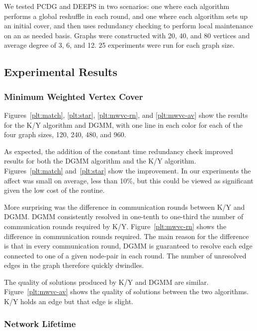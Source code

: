 We tested PCDG and DEEPS in two scenarios: one where each algorithm performs a global reshuffle in each round, and one where each algorithm sets up an initial cover, and then uses redundancy checking to perform local maintenance on an as needed basis. Graphs were constructed with 20, 40, and 80 vertices and average degree of 3, 6, and 12. 25 experiments were run for each graph size.
 
\subsection{Experimental Results}
\label{sub:exp-results}
\subsubsection{Minimum Weighted Vertex Cover}
\label{sub:mwvc-results}

Figures~\ref{plt:match}, \ref{plt:star}, \ref{plt:mwvc-rn}, and \ref{plt:mwvc-av} show the results for the K/Y algorithm and DGMM, with one line in each color for each of the four graph sizes, 120, 240, 480, and 960.

As expected, the addition of the constant time redundancy check improved results for both the DGMM algorithm and the K/Y algorithm. Figures~\ref{plt:match} and~\ref{plt:star} show the improvement. In our experiments the affect was small on average, less than 10\%, but this could be viewed as significant given the low cost of the routine. 


More surprising was the difference in communication rounds between K/Y and DGMM. DGMM consistently resolved in one-tenth to one-third the number of communication rounds required by K/Y. Figure~\ref{plt:mwvc-rn} shows the difference in communication rounds required. The main reason for the difference is that in every communication round, DGMM is guaranteed to resolve each edge connected to one of a given node-pair in each round. The number of unresolved edges in the graph therefore quickly dwindles.


The quality of solutions produced by K/Y and DGMM are similar. Figure~\ref{plt:mwvc-av} shows the quality of solutions between the two algorithms. K/Y holds an edge but that edge is slight.
  


\subsubsection{Network Lifetime}
\label{sub:netlife-results}

